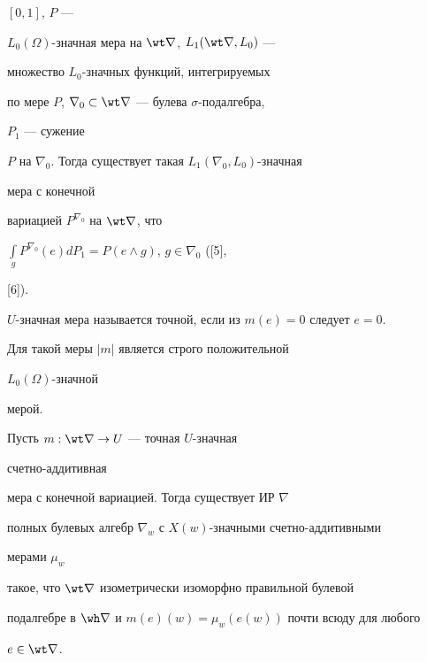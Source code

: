 $[0,1]$, $P$ --- 


$L_0(\Omega)$-значная мера на $\wt\nabla$, $L_1(\wt\nabla,L_0)$ --- 


множество $L_0$-значных функций, интегрируемых 


по мере $P$, $\nabla_0\subset\wt\nabla$ --- булева $\sigma$-подалгебра, 


$P_1$ --- сужение 


$P$ на $\nabla_0$. Тогда существует такая $L_1(\nabla_0,L_0)$-значная 


мера с конечной 


вариацией $P^{\nabla_0}$ на $\wt\nabla$, что 


$\int\limits_g P^{\nabla_0}(e)dP_1=P(e\wedge g)$, $g\in\nabla_0$ ([5], 


[6]). 


\smallskip 


 


$U$-значная мера называется точной, если из $m(e)=0$ следует $e=0$. 


Для такой меры $|m|$ является строго положительной 


$L_0(\Omega)$-значной  


мерой. 


 


\begin{thm} Пусть $m:\wt\nabla\to U$ --- точная $U$-значная 


счетно-аддитивная 


мера с конечной вариацией. Тогда существует ИР $\nabla$  


полных булевых алгебр $\nabla_w$ с $X(w)$-значными счетно-аддитивными 


мерами $\mu_w$ 


такое, что $\wt\nabla$ изометрически изоморфно правильной булевой 


подалгебре в $\wh\nabla$ и $m(e)(w)=\mu_w(e(w))$ почти всюду для любого 


$e\in\wt\nabla$.  


\end{thm} 


 



